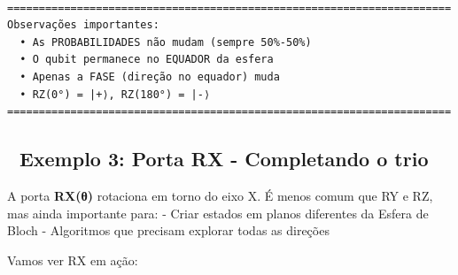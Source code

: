 \documentclass[
  brazilian,
]{report}
\begin{document}
\begin{verbatim}

======================================================================
Observações importantes:
  • As PROBABILIDADES não mudam (sempre 50%-50%)
  • O qubit permanece no EQUADOR da esfera
  • Apenas a FASE (direção no equador) muda
  • RZ(0°) = |+⟩, RZ(180°) = |-⟩
======================================================================
\end{verbatim}

\subsection{🔬 Exemplo 3: Porta RX - Completando o
trio}\label{exemplo-3-porta-rx---completando-o-trio}

A porta \textbf{RX(θ)} rotaciona em torno do eixo X. É menos comum que
RY e RZ, mas ainda importante para: - Criar estados em planos diferentes
da Esfera de Bloch - Algoritmos que precisam explorar todas as direções

Vamos ver RX em ação:
\end{document}
